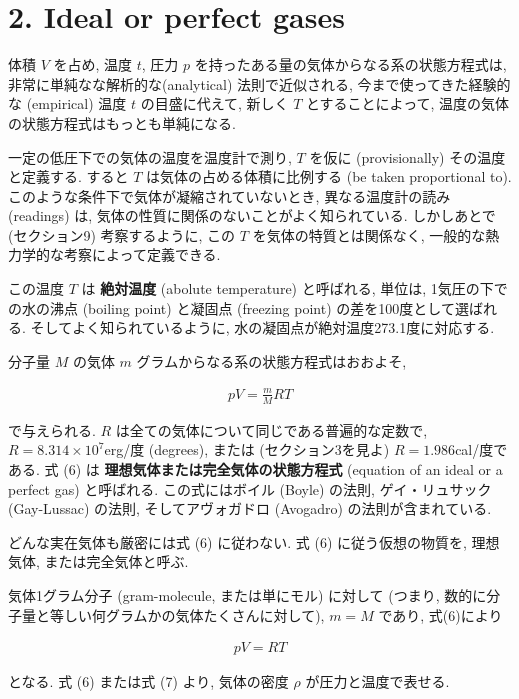 \section*{2. Ideal or perfect gases}
体積 $V$ を占め, 温度 $t$, 圧力 $p$ を持ったある量の気体からなる系の状態方程式は, 非常に単純なな解析的な(analytical) 法則で近似される, 今まで使ってきた経験的な (empirical) 温度 $t$ の目盛に代えて, 新しく $T$ とすることによって, 温度の気体の状態方程式はもっとも単純になる. \par
一定の低圧下での気体の温度を温度計で測り, $T$ を仮に (provisionally) その温度と定義する. すると $T$ は気体の占める体積に比例する (be taken proportional to). このような条件下で気体が凝縮されていないとき, 異なる温度計の読み (readings) は, 気体の性質に関係のないことがよく知られている. しかしあとで (セクション9) 考察するように, この $T$ を気体の特質とは関係なく, 一般的な熱力学的な考察によって定義できる. \par
この温度 $T$ は \textbf{絶対温度} (abolute temperature) と呼ばれる, 単位は, 1気圧の下での水の沸点 (boiling point) と凝固点 (freezing point) の差を100度として選ばれる. そしてよく知られているように, 水の凝固点が絶対温度273.1度に対応する. \par
分子量 $M$ の気体 $m$ グラムからなる系の状態方程式はおおよそ, 

\begin{align}\tag{6}
pV=\frac{m}{M}RT
\end{align}

で与えられる. $R$ は全ての気体について同じである普遍的な定数で, $R=8.314\times10^7$erg/度 (degrees), または (セクション3を見よ) $R=1.986$cal/度である. 式 (6) は \textbf{理想気体または完全気体の状態方程式} (equation of an ideal or a perfect gas) と呼ばれる. この式にはボイル (Boyle) の法則, ゲイ・リュサック (Gay-Lussac) の法則, そしてアヴォガドロ (Avogadro) の法則が含まれている.\par
どんな実在気体も厳密には式 (6) に従わない. 式 (6) に従う仮想の物質を, 理想気体, または完全気体と呼ぶ.\par
気体1グラム分子 (gram-molecule, または単にモル) に対して (つまり, 数的に分子量と等しい何グラムかの気体たくさんに対して), $m=M$ であり, 式(6)により

\begin{align}\tag{7}
pV=RT
\end{align}

となる. 式 (6) または式 (7) より, 気体の密度 $\rho$ が圧力と温度で表せる. 

